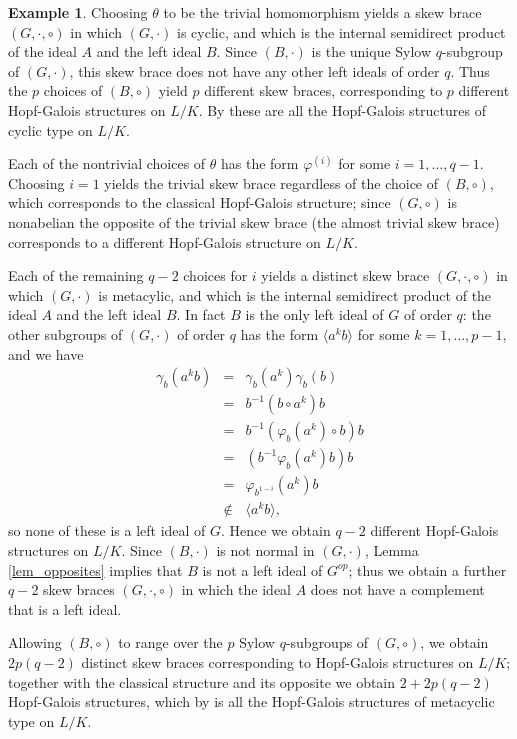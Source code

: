 \documentclass[12pt,a4paper, reqno]{amsart}
\theoremstyle{definition}
\newtheorem{example}[theorem]{Example}
\begin{document}
\begin{example}
Choosing $ \theta $ to be the trivial homomorphism yields a skew brace $ (G,\cdot,\circ) $ in which $ (G,\cdot) $ is cyclic, and which is the internal semidirect product of the ideal $ A $ and the left ideal $ B $. Since $ (B,\cdot)$ is the unique Sylow $ q $-subgroup of $ (G,\cdot) $, this skew brace does not have any other left ideals of order $ q $. Thus the $ p $ choices of $ (B,\circ) $ yield $ p $ different skew braces, corresponding to $ p $ different Hopf-Galois structures on $ L/K $. By \cite[Theorem 6.2]{By04c} these are all the Hopf-Galois structures of cyclic type on $ L/K $. 

Each of the nontrivial choices of $ \theta $ has the form $ \varphi^{(i)} $ for some $ i=1, \ldots ,q-1 $. Choosing $ i=1 $ yields the trivial skew brace regardless of the choice of $ (B,\circ) $, which corresponds to the classical Hopf-Galois structure; since $ (G,\circ) $ is nonabelian the opposite of the trivial skew brace (the almost trivial skew brace) corresponds to a different Hopf-Galois structure on $ L/K $. 

Each of the remaining $ q-2 $ choices for $ i $ yields a distinct skew brace $ (G,\cdot,\circ) $ in which $ (G,\cdot) $ is metacylic, and which is the internal semidirect product of the ideal $ A $ and the left ideal $ B $. In fact $ B $ is the only left ideal of $ G $ of order $ q $: the other subgroups of $ (G,\cdot) $ of order $ q $ has the form $ \langle a^{k}b \rangle $ for some $ k = 1, \ldots ,p-1 $, and we have 
\begin{eqnarray*}
\gamma_{b}(a^{k}b) & = & \gamma_{b}(a^{k}) \gamma_{b}(b) \\
& = & b^{-1} (b \circ a^{k}) b \\
& = & b^{-1}(\varphi_{b}(a^{k}) \circ b)b \\
& = & (b^{-1}\varphi_{b}(a^{k})b)b \\
& = & \varphi_{b^{1-i}}(a^{k})b \\
& \not \in & \langle a^{k}b \rangle,
\end{eqnarray*}
so none of these is a left ideal of $ G $. Hence we obtain $ q-2 $ different Hopf-Galois structures on $ L/K $. Since $ (B,\cdot) $ is not normal in $ (G,\cdot) $, Lemma \ref{lem_opposites} implies that $ B $ is not a left ideal of $ G^{op} $; thus we obtain a further $ q-2 $ skew braces $ (G,\cdot,\circ) $ in which the ideal $ A $ does not have a complement that is a left ideal. 
 
Allowing $ (B,\circ) $ to range over the $ p $ Sylow $ q $-subgroups of $ (G,\circ) $, we obtain $ 2p(q-2) $ distinct skew braces corresponding to Hopf-Galois structures on $ L/K $; together with the classical structure and its opposite we obtain $ 2 + 2p(q-2) $ Hopf-Galois structures, which by \cite[Theorem 6.2]{By04c} is all the Hopf-Galois structures of metacyclic type on $ L/K $.  
\end{example}
\end{document}
